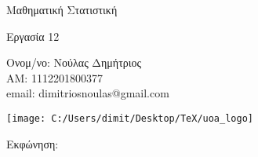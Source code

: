 \documentclass[oneside,a4paper]{article}
\newcommand {\tl}{\textlatin}
\begin{document}
	
	
	\begin{framed}	
		\begin{center}
			\huge Μαθηματική Στατιστική
		\end{center}
		\begin{center}
			\huge Εργασία 12
		\end{center}
		\vspace{0.3truecm}
		\begin{center}
			Ονομ/νο: Νούλας Δημήτριος\\
			ΑΜ: 1112201800377\\
			\tl{email}: \tl{dimitriosnoulas@gmail.com}
		\end{center}
		\vspace{0.3truecm}
	\end{framed}
	\vspace*{\fill}
	\begin{center}
	\texttt{[image: C:/Users/dimit/Desktop/TeX/uoa\_logo]}
	\end{center}
\vspace{1cm}
\pagebreak
{\huge Εκφώνηση:}
\vspace{1cm}
\end{document}
